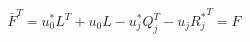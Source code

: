 \begin{equation}
         \bar{F}^{T}=u^{*}_0 L^{T} + u_{0} L -u^{*}_j Q^{T}_j -u_j 
{R^{*}_j}^{T}=F        
\end{equation}

